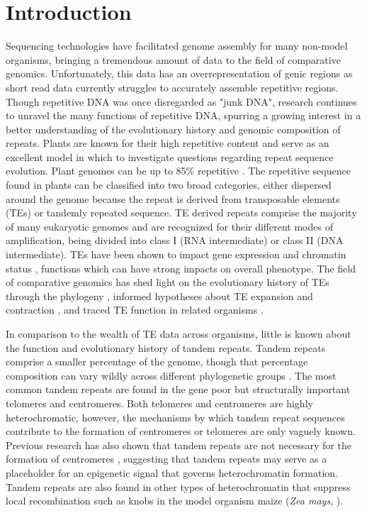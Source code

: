 \documentclass[10pt,letterpaper]{article}
\newcommand{\pb}[1]{\todo[size=\scriptsize, color=Bittersweet]{#1}} %
\begin{document}
\linenumbers

\section*{Introduction}

Sequencing technologies have facilitated genome assembly for many non-model organisms, bringing a tremendous amount of data to the field of comparative genomics.
Unfortunately, this data has an overrepresentation of genic regions as short read data currently struggles to accurately assemble repetitive regions.
Though repetitive DNA was once disregarded as "junk DNA", research continues to unravel the many functions of repetitive DNA, spurring a growing interest in a better understanding of the evolutionary history and genomic composition of repeats.
Plants are known for their high repetitive content and serve as an excellent model in which to investigate questions regarding repeat sequence evolution.
Plant genomes can be up to 85\% repetitive \cite{Schnable2009}.
The repetitive sequence found in plants can be classified into two broad categories, either dispersed around the genome because the repeat is derived from transposable elements (TEs) or tandemly repeated sequence.
TE derived repeats comprise the majority of many eukaryotic genomes and are recognized for their different modes of amplification, being divided into class I (RNA intermediate) or class II (DNA intermediate).
TEs have been shown to impact gene expression \cite{waterland2003transposable} and chromatin status \cite{miura2001mobilization}, functions which can have strong impacts on overall phenotype.
The field of comparative genomics has shed light on the evolutionary history of TEs through the phylogeny \cite{rokas2000rare}, informed hypotheses about TE expansion and contraction \cite{hawkins2008repeated}, and traced TE function in related organisms \cite{daniels1990evidence}.%

In comparison to the wealth of TE data across organisms, little is known about the function and evolutionary history of tandem repeats.
Tandem repeats comprise a smaller percentage of the genome, though that percentage composition can vary wildly across different phylogenetic groups \cite{gaut2008selection}.
The most common tandem repeats are found in the gene poor but structurally important telomeres and centromeres.
Both telomeres and centromeres are highly heterochromatic, however, the mechanisms by which tandem repeat sequences contribute to the formation of centromeres or telomeres are only vaguely known.
Previous research has also shown that tandem repeats are not necessary for the formation of centromeres \cite{zhong2002centromeric}, suggesting that tandem repeats may serve as a placeholder for an epigenetic signal that governs heterochromatin formation.
Tandem repeats are also found in other types of heterochromatin that suppress local recombination such as knobs in the model organism maize (\emph{Zea mays}, \cite{chang1974interaction}).
\end{document}
